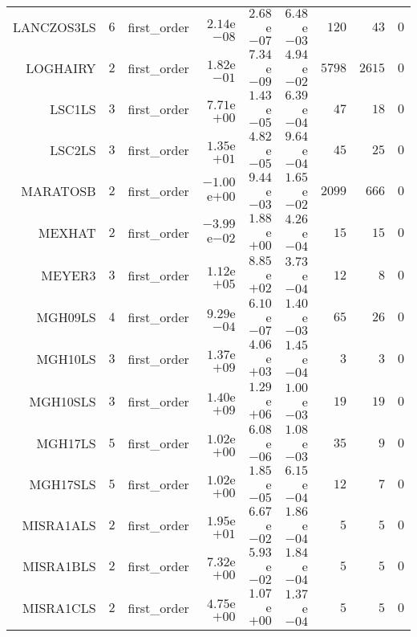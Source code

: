 \begin{longtable}{rrrrrrrrr}
LANCZOS3LS & \(     6\) & first\_order & \( 2.14\)e\(-08\) & \( 2.68\)e\(-07\) & \( 6.48\)e\(-03\) & \(   120\) & \(    43\) & \(     0\) \\
LOGHAIRY & \(     2\) & first\_order & \( 1.82\)e\(-01\) & \( 7.34\)e\(-09\) & \( 4.94\)e\(-02\) & \(  5798\) & \(  2615\) & \(     0\) \\
LSC1LS & \(     3\) & first\_order & \( 7.71\)e\(+00\) & \( 1.43\)e\(-05\) & \( 6.39\)e\(-04\) & \(    47\) & \(    18\) & \(     0\) \\
LSC2LS & \(     3\) & first\_order & \( 1.35\)e\(+01\) & \( 4.82\)e\(-05\) & \( 9.64\)e\(-04\) & \(    45\) & \(    25\) & \(     0\) \\
MARATOSB & \(     2\) & first\_order & \(-1.00\)e\(+00\) & \( 9.44\)e\(-03\) & \( 1.65\)e\(-02\) & \(  2099\) & \(   666\) & \(     0\) \\
MEXHAT & \(     2\) & first\_order & \(-3.99\)e\(-02\) & \( 1.88\)e\(+00\) & \( 4.26\)e\(-04\) & \(    15\) & \(    15\) & \(     0\) \\
MEYER3 & \(     3\) & first\_order & \( 1.12\)e\(+05\) & \( 8.85\)e\(+02\) & \( 3.73\)e\(-04\) & \(    12\) & \(     8\) & \(     0\) \\
MGH09LS & \(     4\) & first\_order & \( 9.29\)e\(-04\) & \( 6.10\)e\(-07\) & \( 1.40\)e\(-03\) & \(    65\) & \(    26\) & \(     0\) \\
MGH10LS & \(     3\) & first\_order & \( 1.37\)e\(+09\) & \( 4.06\)e\(+03\) & \( 1.45\)e\(-04\) & \(     3\) & \(     3\) & \(     0\) \\
MGH10SLS & \(     3\) & first\_order & \( 1.40\)e\(+09\) & \( 1.29\)e\(+06\) & \( 1.00\)e\(-03\) & \(    19\) & \(    19\) & \(     0\) \\
MGH17LS & \(     5\) & first\_order & \( 1.02\)e\(+00\) & \( 6.08\)e\(-06\) & \( 1.08\)e\(-03\) & \(    35\) & \(     9\) & \(     0\) \\
MGH17SLS & \(     5\) & first\_order & \( 1.02\)e\(+00\) & \( 1.85\)e\(-05\) & \( 6.15\)e\(-04\) & \(    12\) & \(     7\) & \(     0\) \\
MISRA1ALS & \(     2\) & first\_order & \( 1.95\)e\(+01\) & \( 6.67\)e\(-02\) & \( 1.86\)e\(-04\) & \(     5\) & \(     5\) & \(     0\) \\
MISRA1BLS & \(     2\) & first\_order & \( 7.32\)e\(+00\) & \( 5.93\)e\(-02\) & \( 1.84\)e\(-04\) & \(     5\) & \(     5\) & \(     0\) \\
MISRA1CLS & \(     2\) & first\_order & \( 4.75\)e\(+00\) & \( 1.07\)e\(+00\) & \( 1.37\)e\(-04\) & \(     5\) & \(     5\) & \(     0\) \\

\end{longtable}
